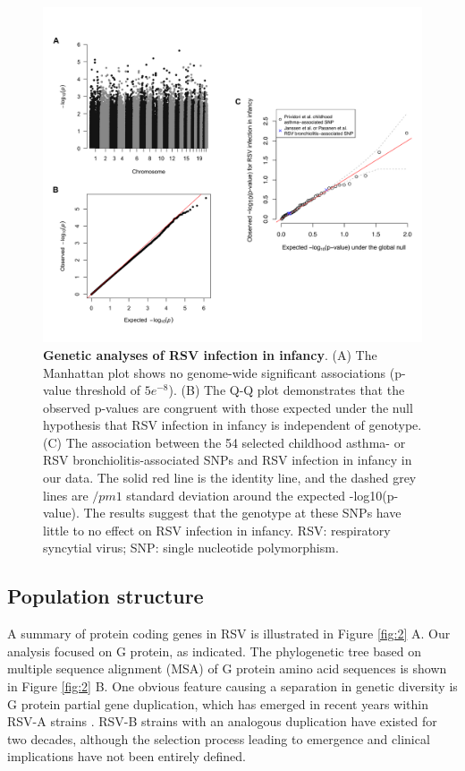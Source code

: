 \documentclass{article} %
\begin{document}
\begin{figure}[ht] \hspace{-0.5cm}
\begin{center}
    \includegraphics[scale=0.07]{host_genetics}
\end{center} 
	\caption{\textbf{Genetic analyses of RSV infection in infancy}.
		(A) The Manhattan plot shows no genome-wide significant associations (p-value threshold of $5e^{-8}$).
		(B) The Q-Q plot demonstrates that the observed p-values are congruent with those expected under the null hypothesis that RSV infection in infancy is independent of genotype. 
		(C) The association between the 54 selected childhood asthma- or RSV bronchiolitis-associated SNPs and RSV infection in infancy in our data. 
		The solid red line is the identity line, and the dashed grey lines are $/pm 1$ standard deviation around the expected -log10(p-value). 
		The results suggest that the genotype at these SNPs have little to no effect on RSV infection in infancy. 
		RSV: respiratory syncytial virus; SNP: single nucleotide polymorphism.
	}
	\label{fig:host_genetics} 
\end{figure}
\clearpage

\subsection{Population structure}
A summary of protein coding genes in RSV is illustrated in
Figure \ref{fig:2} A.
Our analysis focused on G protein, as indicated.
The phylogenetic tree based on multiple sequence alignment (MSA) of G protein amino acid sequences is shown in 
Figure \ref{fig:2} B.
One obvious feature causing a separation in genetic diversity is G protein partial gene duplication, 
which has emerged in recent years within RSV-A strains 
\citep{eshaghi2012genetic}.
RSV-B strains with an analogous duplication have existed for two decades, 
although the selection process leading to emergence and clinical implications have not been entirely defined.
\end{document}
